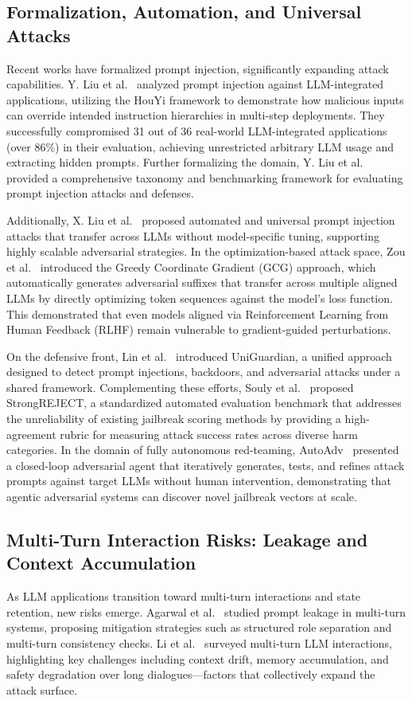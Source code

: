 \documentclass[conference]{IEEEtran}
\begin{document}
\subsection{Formalization, Automation, and Universal Attacks}
Recent works have formalized prompt injection, significantly expanding attack capabilities. Y. Liu et al.~\cite{liu2023houyi} analyzed prompt injection against LLM-integrated applications, utilizing the HouYi framework to demonstrate how malicious inputs can override intended instruction hierarchies in multi-step deployments. They successfully compromised 31 out of 36 real-world LLM-integrated applications (over 86\%) in their evaluation, achieving unrestricted arbitrary LLM usage and extracting hidden prompts. Further formalizing the domain, Y. Liu et al.~\cite{liu2024taxonomy} provided a comprehensive taxonomy and benchmarking framework for evaluating prompt injection attacks and defenses.

Additionally, X. Liu et al.~\cite{liux2024universal} proposed automated and universal prompt injection attacks that transfer across LLMs without model-specific tuning, supporting highly scalable adversarial strategies. In the optimization-based attack space, Zou et al.~\cite{zou2023gcg} introduced the Greedy Coordinate Gradient (GCG) approach, which automatically generates adversarial suffixes that transfer across multiple aligned LLMs by directly optimizing token sequences against the model's loss function. This demonstrated that even models aligned via Reinforcement Learning from Human Feedback (RLHF) remain vulnerable to gradient-guided perturbations.

On the defensive front, Lin et al.~\cite{lin2024uniguardian} introduced UniGuardian, a unified approach designed to detect prompt injections, backdoors, and adversarial attacks under a shared framework. Complementing these efforts, Souly et al.~\cite{souly2024strongreject} proposed StrongREJECT, a standardized automated evaluation benchmark that addresses the unreliability of existing jailbreak scoring methods by providing a high-agreement rubric for measuring attack success rates across diverse harm categories. In the domain of fully autonomous red-teaming, AutoAdv~\cite{autoadv2025} presented a closed-loop adversarial agent that iteratively generates, tests, and refines attack prompts against target LLMs without human intervention, demonstrating that agentic adversarial systems can discover novel jailbreak vectors at scale.

\subsection{Multi-Turn Interaction Risks: Leakage and Context Accumulation}
As LLM applications transition toward multi-turn interactions and state retention, new risks emerge. Agarwal et al.~\cite{agarwal2024} studied prompt leakage in multi-turn systems, proposing mitigation strategies such as structured role separation and multi-turn consistency checks. Li et al.~\cite{li2024} surveyed multi-turn LLM interactions, highlighting key challenges including context drift, memory accumulation, and safety degradation over long dialogues---factors that collectively expand the attack surface.
\end{document}
